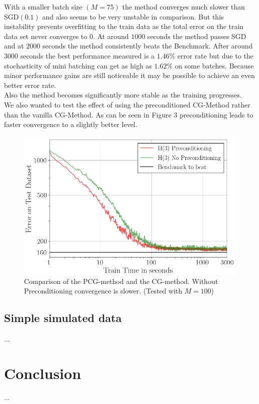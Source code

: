 \documentclass[conference]{IEEEtran}
\begin{document}
	With a smaller batch size $(M=75)$ the method converges much slower than SGD$(0.1)$ and also seems to be very unstable in comparison. But this instability prevents overfitting to the train data as the total error on the train data set never converges to $0$. At around $1000$ seconds the method passes SGD and at $2000$ seconds the method consistently beats the Benchmark. After around $3000$ seconds the best performance measured is a $1.46\%$ error rate but due to the stochasticity of mini batching can get as high as $1.62\%$ on some batches. Because minor performance gains are still noticeable it may be possible to achieve an even better error rate. \\
	Also the method becomes significantly more stable as the training progresses.\\
	We also wanted to test the effect of using the preconditioned CG-Method rather than the vanilla CG-Method. As can be seen in Figure 3 preconditioning leads to faster convergence to a slightly better level.
	
	
	\begin{figure}[htbp]
		\centerline{\includegraphics[scale=0.53]{Precond.png}}
		\caption{Comparison of the PCG-method and the CG-method. Without Preconditioning convergence is slower. (Tested with $M=100$)}
		\label{fig}
	\end{figure}	
	
	
	\subsection{Simple simulated data}
	...




	
	\section{Conclusion}
	...
	
\end{document}
